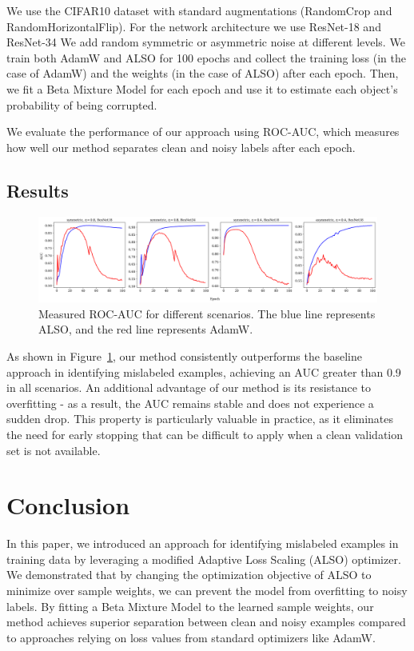 \documentclass[12pt]{article}
\begin{document}
We use the CIFAR10 dataset \citep{cifar} with standard augmentations (RandomCrop and RandomHorizontalFlip). For the network architecture we use ResNet-18 and ResNet-34 \citep{He_2016_CVPR} We add random symmetric or asymmetric noise at different levels. We train both AdamW and ALSO for 100 epochs and collect the training loss (in the case of AdamW) and the weights (in the case of ALSO) after each epoch. Then, we fit a Beta Mixture Model for each epoch and use it to estimate each object's probability of being corrupted.

We evaluate the performance of our approach using ROC-AUC, which measures how well our method separates clean and noisy labels after each epoch.

\subsection{Results}

\begin{figure}[H]
    \centering
    \includegraphics[width=1.0\linewidth]{figures/adam_vs_also.png}
    \caption{Measured ROC-AUC for different scenarios. The blue line represents ALSO, and the red line represents AdamW.}
    \label{fig:auc}
\end{figure}

As shown in Figure~\ref{fig:auc}, our method consistently outperforms the baseline approach in identifying mislabeled examples, achieving an AUC greater than 0.9 in all scenarios. An additional advantage of our method is its resistance to overfitting - as a result, the AUC remains stable and does not experience a sudden drop. This property is particularly valuable in practice, as it eliminates the need for early stopping that can be difficult to apply when a clean validation set is not available.

\section{Conclusion}

In this paper, we introduced an approach for identifying mislabeled examples in training data by leveraging a modified Adaptive Loss Scaling (ALSO) optimizer. We demonstrated that by changing the optimization objective of ALSO to minimize over sample weights, we can prevent the model from overfitting to noisy labels. By fitting a Beta Mixture Model to the learned sample weights, our method achieves superior separation between clean and noisy examples compared to approaches relying on loss values from standard optimizers like AdamW.


\end{document}
